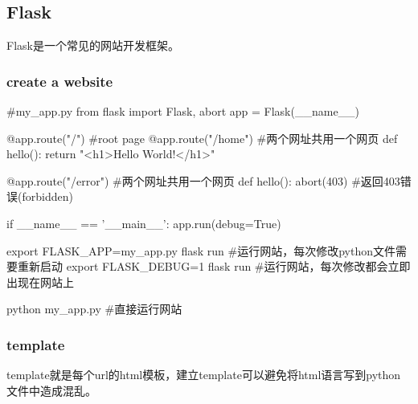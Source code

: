   \subsection{Flask}
    Flask是一个常见的网站开发框架。
    \subsubsection{create a website}
      \begin{codeblock}[language=python, caption={create a web site}]
        #my\_app.py
        from flask import Flask, abort
        app = Flask(__name__)

        @app.route("/") #root page
        @app.route("/home") #两个网址共用一个网页
        def hello():
            return "<h1>Hello World!</h1>"

        @app.route("/error") #两个网址共用一个网页
        def hello():
            abort(403) #返回403错误(forbidden)

        if __name__ == '__main__':
            app.run(debug=True)
      \end{codeblock}

      \begin{codeblock}[language=bash, caption={start a web site}]
        export FLASK_APP=my_app.py
        flask run #运行网站，每次修改python文件需要重新启动
        export FLASK_DEBUG=1
        flask run #运行网站，每次修改都会立即出现在网站上

        python my_app.py #直接运行网站
      \end{codeblock}

    \subsubsection{template}
      template就是每个url的html模板，建立template可以避免将html语言写到python文件中造成混乱。

